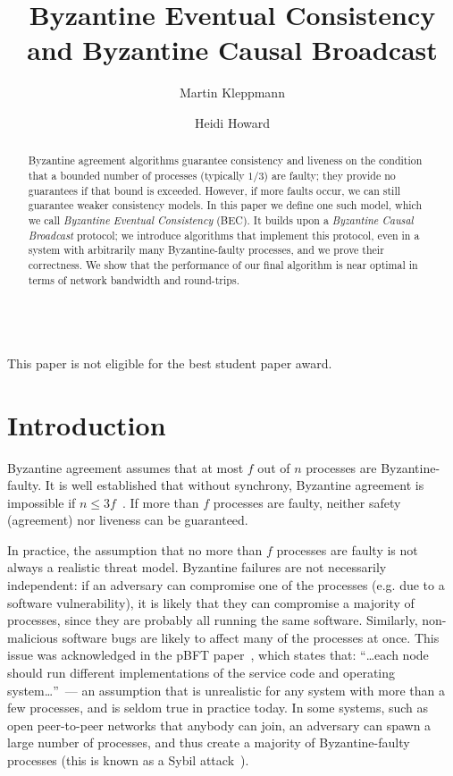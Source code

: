 \documentclass[a4paper,anonymous,USenglish]{lipics-v2019}
\title{Byzantine Eventual Consistency and Byzantine Causal Broadcast}
\author{Martin Kleppmann}{University of Cambridge}{mk428@cst.cam.ac.uk}{https://orcid.org/0000-0001-7252-6958}{Supported by a Leverhulme Trust Early Career Fellowship and by the Isaac Newton Trust.}
\author{Heidi Howard}{University of Cambridge}{hh360@cst.cam.ac.uk}{https://orcid.org/0000-0001-5256-7664}{}
\begin{document}
\maketitle
\begin{abstract}
    Byzantine agreement algorithms guarantee consistency and liveness on the condition that a bounded number of processes (typically $1/3$) are faulty; they provide no guarantees if that bound is exceeded.
    However, if more faults occur, we can still guarantee weaker consistency models. 
    In this paper we define one such model, which we call \emph{Byzantine Eventual Consistency} (BEC).
    It builds upon a \emph{Byzantine Causal Broadcast} protocol; we introduce algorithms that implement this protocol, even in a system with arbitrarily many Byzantine-faulty processes, and we prove their correctness.
    We show that the performance of our final algorithm is near optimal in terms of network bandwidth and round-trips.
\end{abstract}
\maketitle\\[20pt]
This paper is not eligible for the best student paper award.
\newpage

\section{Introduction}

Byzantine agreement assumes that at most $f$ out of $n$ processes are Byzantine-faulty.
It is well established that without synchrony, Byzantine agreement is impossible if $n\leq3f$~\cite{Dwork:1988,Lamport:1982}.
If more than $f$ processes are faulty, neither safety (agreement) nor liveness can be guaranteed.

In practice, the assumption that no more than $f$ processes are faulty is not always a realistic threat model.
Byzantine failures are not necessarily independent: if an adversary can compromise one of the processes (e.g. due to a software vulnerability), it is likely that they can compromise a majority of processes, since they are probably all running the same software. 
Similarly, non-malicious software bugs are likely to affect many of the processes at once.
This issue was acknowledged in the pBFT paper~\cite{Castro:1999}, which states that: ``{\dots}each node should run different implementations of the service code and operating system{\dots}''~--- an assumption that is unrealistic for any system with more than a few processes, and is seldom true in practice today.
In some systems, such as open peer-to-peer networks that anybody can join, an adversary can spawn a large number of processes, and thus create a majority of Byzantine-faulty processes (this is known as a Sybil attack~\cite{Douceur:2002}).
\end{document}
